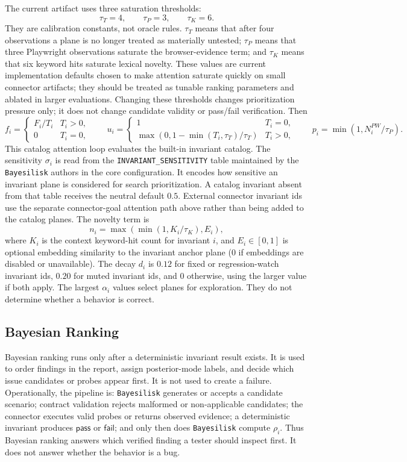 \documentclass[10pt]{article}
\newcommand{\tool}{\texttt{Bayesilisk}\xspace}
\newcommand{\Pass}{\mathsf{pass}}
\newcommand{\Fail}{\mathsf{fail}}
\begin{document}
The current artifact uses three saturation thresholds:
\[
  \tau_T=4,\qquad \tau_P=3,\qquad \tau_K=6.
\]
They are calibration constants, not oracle rules. \(\tau_T\) means that after
four observations a plane is no longer treated as materially untested;
\(\tau_P\) means that three Playwright observations saturate the browser-evidence
term; and \(\tau_K\) means that six keyword hits saturate lexical novelty.
These values are current implementation defaults chosen to make attention
saturate quickly on small connector artifacts; they should be treated as tunable
ranking parameters and ablated in larger evaluations. Changing these thresholds
changes prioritization pressure only; it does not change candidate validity or
pass/fail verification. Then
\[
  f_i =
  \begin{cases}
    F_i/T_i & T_i>0,\\
    0 & T_i=0,
  \end{cases}
  \qquad
  u_i =
  \begin{cases}
    1 & T_i=0,\\
    \max(0,1-\min(T_i,\tau_T)/\tau_T) & T_i>0,
  \end{cases}
  \qquad
  p_i=\min(1,N_i^{PW}/\tau_P).
\]
This catalog attention loop evaluates the built-in invariant catalog. The
sensitivity \(\sigma_i\) is read from the
\texttt{INVARIANT\_SENSITIVITY} table maintained by the \tool authors in the
core configuration. It encodes how sensitive an invariant plane is considered
for search prioritization. A catalog invariant absent from that table receives
the neutral default \(0.5\). External connector invariant ids use the separate connector-goal attention
path above rather than being added to the catalog planes. The novelty term is
\[
  n_i=\max(\min(1,K_i/\tau_K),E_i),
\]
where \(K_i\) is the context keyword-hit count for invariant \(i\), and
\(E_i\in[0,1]\) is optional embedding similarity to the invariant anchor plane
(\(0\) if embeddings are disabled or unavailable). The decay \(d_i\) is \(0.12\)
for fixed or regression-watch invariant ids, \(0.20\) for muted invariant ids,
and \(0\) otherwise, using the larger value if both apply. The largest
\(\alpha_i\) values select planes for exploration. They do not determine whether
a behavior is correct.

\subsection{Bayesian Ranking}

Bayesian ranking runs only after a deterministic invariant result exists. It is
used to order findings in the report, assign posterior-mode labels, and decide
which issue candidates or probes appear first. It is not used to create a
failure. Operationally, the pipeline is: \tool generates or accepts a candidate
scenario; contract validation rejects malformed or non-applicable candidates;
the connector executes valid probes or returns observed evidence; a deterministic
invariant produces \(\Pass\) or \(\Fail\); and only then does \tool compute
\(\rho_i\). Thus Bayesian ranking answers which verified finding a tester should
inspect first. It does not answer whether the behavior is a bug.
\end{document}
